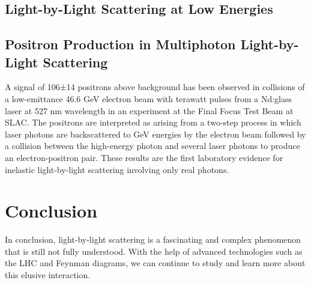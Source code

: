 \documentclass{article}
\begin{document}
\subsection{Light-by-Light Scattering at Low Energies}%

\subsection{Positron Production in Multiphoton Light-by-Light Scattering}%
\label{subsec:positron}

\label{subsec:light-light-low-energy}
A signal of 106±14 positrons above background has been observed in collisions of a low-emittance 46.6 GeV electron beam with terawatt pulses from a Nd:glass laser at 527 nm wavelength in an experiment at the Final Focus Test Beam at SLAC. The positrons are interpreted as arising from a two-step process in which laser photons are backscattered to GeV energies by the electron beam followed by a collision between the high-energy photon and several laser photons to produce an electron-positron pair. These results are the first laboratory evidence for inelastic light-by-light scattering involving only real photons.

\section{Conclusion}

In conclusion, light-by-light scattering is a fascinating and complex phenomenon that is still not fully understood. With the help of advanced technologies such as the LHC and Feynman diagrams, we can continue to study and learn more about this elusive interaction.

    \printbibliography
\end{document}
